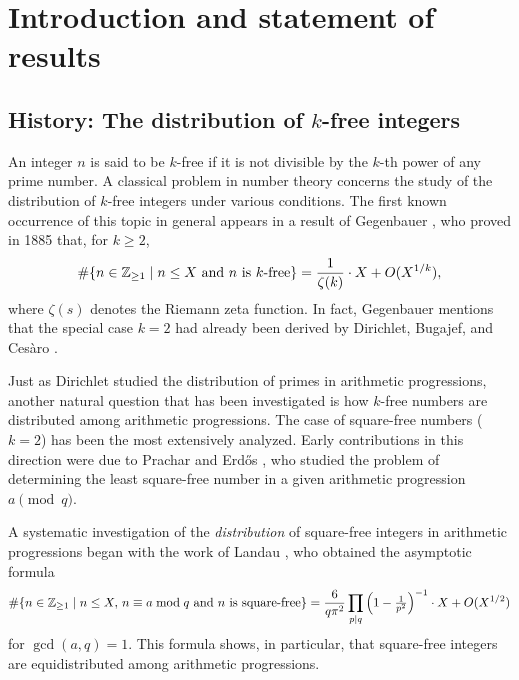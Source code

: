 \documentclass[11pt, reqno]{amsart}
\numberwithin{equation}{section}
\newcommand{\suchthat}{\;\ifnum\currentgrouptype=16 \middle\fi|\;}
\newcommand{\Z}{\mathbb{Z}}
\theoremstyle{definition}
\begin{document}
\maketitle


\section{Introduction and statement of results}

\subsection{History: The distribution of \texorpdfstring{$k$}{k}-free integers}
An integer $n$ is said to be $k$-free if it is not divisible by the $k$-th power of any prime number. A classical problem in number theory concerns the study of the distribution of $k$-free integers under various conditions. The first known occurrence of this topic in general appears in a result of Gegenbauer \cite[pp.~46--47]{Gege85}, who proved in 1885 that, for $k \ge 2$,
\begin{align}\label{eqn:gegenbauer-formula}
\#\{ n \in \Z_{\ge 1} \suchthat \text{$n \le X$ and $n$ is $k$-free} \}
= \frac{1}{\zeta(k)} \cdot X + O(X^{1/k}),
\end{align}
where $\zeta(s)$ denotes the Riemann zeta function. In fact, Gegenbauer mentions that the special case $k = 2$ had already been derived by Dirichlet, Bugajef, and Cesàro \cite[p. 47]{Gege85}.  

Just as Dirichlet studied the distribution of primes in arithmetic progressions, another natural question that has been investigated is how $k$-free numbers are distributed among arithmetic progressions. The case of square-free numbers ($k = 2$) has been the most extensively analyzed. Early contributions in this direction were due to Prachar \cite{Pra58} and Erd\H{o}s \cite{Erd60}, who studied the problem of determining the least square-free number in a given arithmetic progression $a \pmod{q}$. 

A systematic investigation of the \emph{distribution} of square-free integers in arithmetic progressions began with the work of Landau \cite[pp. 633--636]{landau1909handbuch}, who obtained the asymptotic formula
\[
\#\{ n \in \Z_{\ge 1} \suchthat \text{$n \le X, \, n \equiv a \bmod q$ and $n$ is square-free} \}
= \frac{6}{q\pi^2}
\prod_{p\mid q} \left(1 - \tfrac{1}{p^2} \right)^{-1} \cdot X
+ O(X^{1/2})
\]
for $\gcd(a, q) = 1$. This formula shows, in particular, that square-free integers are equidistributed among arithmetic progressions.
\end{document}
